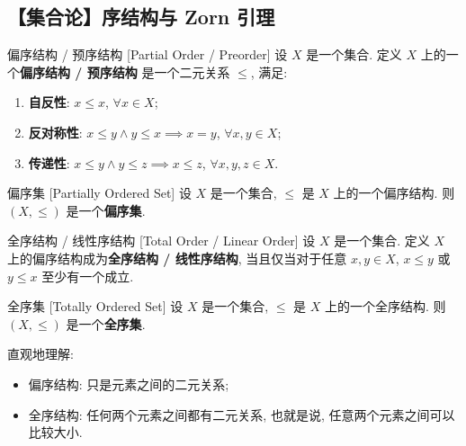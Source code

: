     \subsection{【集合论】序结构与 Zorn 引理}

        \begin{dfn}
            {偏序结构 / 预序结构}
            [Partial Order / Preorder]
            设 \(X\) 是一个集合. 定义 \(X\) 上的一个\textbf{偏序结构 / 预序结构} 是一个二元关系 \(\leq\), 满足:
            \begin{enumerate}[label=(\roman*)]
                \item \textbf{自反性}: \(x\leq x\), \(\forall x\in X\);
                \item \textbf{反对称性}: \(x\leq y\land y\leq x\implies x=y\), \(\forall x,y\in X\);
                \item \textbf{传递性}: \(x\leq y\land y\leq z\implies x\leq z\), \(\forall x,y,z\in X\).
            \end{enumerate}
        \end{dfn}

        \begin{dfn}
            {偏序集}
            [Partially Ordered Set]
            设 \(X\) 是一个集合, \(\leq\) 是 \(X\) 上的一个偏序结构. 则 \((X, \leq)\) 是一个\textbf{偏序集}.
        \end{dfn}

        \begin{dfn}
            {全序结构 / 线性序结构}
            [Total Order / Linear Order]
            设 \(X\) 是一个集合. 定义 \(X\) 上的偏序结构成为\textbf{全序结构 / 线性序结构}, 当且仅当对于任意 \(x,y\in X\), \(x\leq y\) 或 \(y\leq x\) 至少有一个成立. 
        \end{dfn}

        \begin{dfn}
            {全序集}
            [Totally Ordered Set]
            设 \(X\) 是一个集合, \(\leq\) 是 \(X\) 上的一个全序结构. 则 \((X, \leq)\) 是一个\textbf{全序集}.
        \end{dfn}

        \begin{rmk}
            [Dedicatia]
            直观地理解:
            \begin{itemize}
                \item 偏序结构: 只是元素之间的二元关系;
                \item 全序结构: 任何两个元素之间都有二元关系, 也就是说, 任意两个元素之间可以比较大小.
            \end{itemize}
        \end{rmk}

